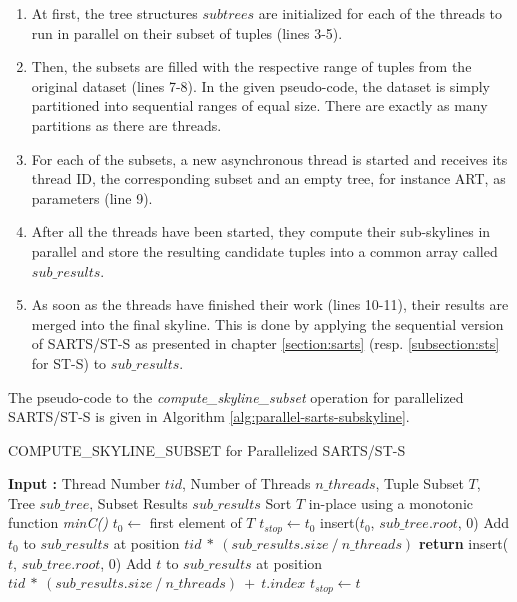 \begin{enumerate}
	\item At first, the tree structures $subtrees$ are initialized for each of the threads to run in parallel on their subset of tuples (lines 3-5).
	\item Then, the subsets are filled with the respective range of tuples from the original dataset (lines 7-8). In the given pseudo-code, the dataset is simply partitioned into sequential ranges of equal size. There are exactly as many partitions as there are threads. 
	\item For each of the subsets, a new asynchronous thread is started and receives its thread ID, the corresponding subset and an empty tree, for instance ART, as parameters (line 9). 
	\item After all the threads have been started, they compute their sub-skylines in parallel and store the resulting candidate tuples into a common array called $sub\_results$. 
	\item As soon as the threads have finished their work (lines 10-11), their results are merged into the final skyline. This is done by applying the sequential version of SARTS/ST-S as presented in chapter \ref{section:sarts} (resp. \ref{subsection:sts} for ST-S) to $sub\_results$. 
\end{enumerate}

The pseudo-code to the \textit{compute\_skyline\_subset} operation for parallelized SARTS/ST-S is given in Algorithm \ref{alg:parallel-sarts-subskyline}. 
\begin{algorithm}[h]
	\caption{COMPUTE\_SKYLINE\_SUBSET for Parallelized SARTS/ST-S} \label{alg:parallel-sarts-subskyline}
	\begin{algorithmic}[1]		
		\State \textbf{Input :} Thread Number $tid$, Number of Threads $n\_threads$, Tuple Subset $T$, Tree $sub\_tree$, Subset Results $sub\_results$
		\State Sort $ T $ in-place using a monotonic function \textit{minC()}
		\State $t_{0} \gets $ first element of $T$
		\State $t_{stop} \gets t_{0}$
		\State insert($t_{0}$, $sub\_tree.root$, 0)
		\State Add $t_{0}$ to $sub\_results$ at position $tid~*~(sub\_results.size~/~n\_threads)$
				\textbf{return}
			\EndIf
				\State insert($t$, $sub\_tree.root$, 0)
				\State Add $t$ to $sub\_results$ at position $tid~*~(sub\_results.size~/~n\_threads)~+~t.index$
					\State $t_{stop} \gets t$ 
				\EndIf
			\EndIf
		\EndFor		
	\end{algorithmic}
\end{algorithm}

